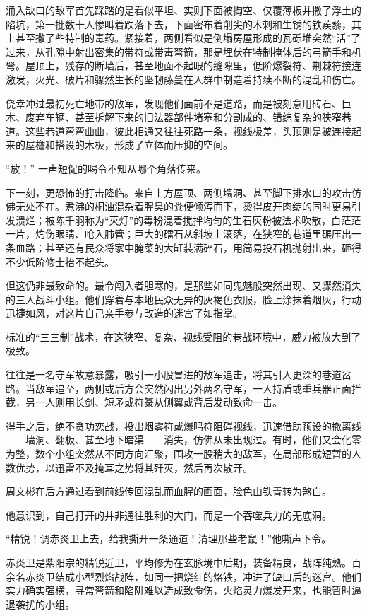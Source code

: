 涌入缺口的敌军首先踩踏的是看似平坦、实则下面被掏空、仅覆薄板并撒了浮土的陷坑，第一批数十人惨叫着跌落下去，下面密布着削尖的木刺和生锈的铁蒺藜，其上甚至撒了些特制的毒药。紧接着，两侧看似是倒塌房屋形成的瓦砾堆突然“活”了过来，从孔隙中射出密集的带符或带毒弩箭，那是埋伏在特制掩体后的弓箭手和机弩。屋顶上，残存的断墙后，甚至地面不起眼的缝隙里，低阶爆裂符、荆棘符接连激发，火光、破片和骤然生长的坚韧藤蔓在人群中制造着持续不断的混乱和伤亡。

侥幸冲过最初死亡地带的敌军，发现他们面前不是道路，而是被刻意用砖石、巨木、废弃车辆、甚至拆解下来的旧法器部件堵塞和分割成的、错综复杂的狭窄巷道。这些巷道弯弯曲曲，彼此相通又往往死路一条，视线极差，头顶则是被连接起来的屋檐和搭设的木板，形成了立体而压抑的空间。

“放！” 一声短促的喝令不知从哪个角落传来。

下一刻，更恐怖的打击降临。来自上方屋顶、两侧墙洞、甚至脚下排水口的攻击仿佛无处不在。煮沸的桐油混杂着腥臭的粪便倾泻而下，烫得皮开肉绽的同时更易引发溃烂；被陈千羽称为“灭灯”的毒粉混着搅拌均匀的生石灰粉被法术吹散，白茫茫一片，灼伤眼睛、呛入肺管；巨大的礌石从斜坡上滚落，在狭窄的巷道里碾压出一条血路；甚至还有民众将家中腌菜的大缸装满碎石，用简易投石机抛射出来，砸得不少低阶修士抬不起头。

但这仍非最致命的。最令闯入者胆寒的，是那些如同鬼魅般突然出现、又骤然消失的三人战斗小组。他们穿着与本地民众无异的灰褐色衣服，脸上涂抹着烟灰，行动迅捷如风，对这片自己亲手参与改造的迷宫了如指掌。

标准的“三三制”战术，在这狭窄、复杂、视线受阻的巷战环境中，威力被放大到了极致。

往往是一名守军故意暴露，吸引一小股冒进的敌军追击，将其引入更深的巷道岔路。当敌军追至，两侧或后方会突然闪出另外两名守军，一人持盾或重兵器正面拦截，另一人则用长剑、短矛或符箓从侧翼或背后发动致命一击。

得手之后，绝不贪功恋战，投出烟雾符或爆鸣符阻碍视线，迅速借助预设的撤离线——墙洞、翻板、甚至地下暗渠——消失，仿佛从未出现过。有时，他们又会化零为整，数个小组突然从不同方向汇聚，围攻一股稍大的敌军，在局部形成短暂的人数优势，以迅雷不及掩耳之势将其歼灭，然后再次散开。

周文彬在后方通过看到前线传回混乱而血腥的画面，脸色由铁青转为煞白。

他意识到，自己打开的并非通往胜利的大门，而是一个吞噬兵力的无底洞。

“精锐！调赤炎卫上去，给我撕开一条通道！清理那些老鼠！”他嘶声下令。

赤炎卫是紫阳宗的精锐近卫，平均修为在玄脉境中后期，装备精良，战阵纯熟。百余名赤炎卫结成小型烈焰战阵，如同一把烧红的烙铁，冲进了缺口后的迷宫。他们实力确实强横，寻常弩箭和陷阱难以造成致命伤，火焰灵力爆发开来，也能暂时逼退袭扰的小组。


